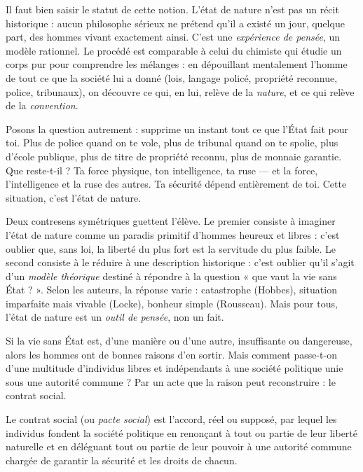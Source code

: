 \documentclass[11pt]{article}
\newcommand{\cle}[1]{{\popxbold\color{popdark}#1}}
\newcounter{popsec}
\newcounter{popsub}
\newcommand{\courssub}[1]{%
  \stepcounter{popsub}%
  \par\vspace{9pt}\noindent{\popxbold\fontsize{11.5}{13}\selectfont\color{popink}{\color{poporange}\thepopsec.\thepopsub}\hspace{6pt}#1}\par\nopagebreak\vspace{4pt}
}
\begin{document}
Il faut bien saisir le statut de cette notion. L'état de nature n'est pas un récit historique : aucun philosophe sérieux ne prétend qu'il a existé un jour, quelque part, des hommes vivant exactement ainsi. C'est une \emph{expérience de pensée}, un modèle rationnel. Le procédé est comparable à celui du chimiste qui étudie un corps pur pour comprendre les mélanges : en dépouillant mentalement l'homme de tout ce que la société lui a donné (lois, langage policé, propriété reconnue, police, tribunaux), on découvre ce qui, en lui, relève de la \emph{nature}, et ce qui relève de la \emph{convention}.

Posons la question autrement : supprime un instant tout ce que l'État fait pour toi. Plus de police quand on te vole, plus de tribunal quand on te spolie, plus d'école publique, plus de titre de propriété reconnu, plus de monnaie garantie. Que reste-t-il ? Ta force physique, ton intelligence, ta ruse — et la force, l'intelligence et la ruse des autres. Ta sécurité dépend entièrement de toi. Cette situation, c'est l'état de nature.

\begin{attention}
Deux contresens symétriques guettent l'élève. Le premier consiste à imaginer l'état de nature comme un paradis primitif d'hommes heureux et libres : c'est oublier que, sans loi, la liberté du plus fort est la servitude du plus faible. Le second consiste à le réduire à une description historique : c'est oublier qu'il s'agit d'un \emph{modèle théorique} destiné à répondre à la question « que vaut la vie sans État ? ». Selon les auteurs, la réponse varie : catastrophe (Hobbes), situation imparfaite mais vivable (Locke), bonheur simple (Rousseau). Mais pour tous, l'état de nature est un \emph{outil de pensée}, non un fait.
\end{attention}

\courssub{Le contrat social : la sortie de l'état de nature}

Si la vie sans État est, d'une manière ou d'une autre, insuffisante ou dangereuse, alors les hommes ont de bonnes raisons d'en sortir. Mais comment passe-t-on d'une multitude d'individus libres et indépendants à une société politique unie sous une autorité commune ? Par un acte que la raison peut reconstruire : le \cle{contrat social}.

\begin{definition}
Le \cle{contrat social} (ou \emph{pacte social}) est l'accord, réel ou supposé, par lequel les individus fondent la société politique en renonçant à tout ou partie de leur liberté naturelle et en déléguant tout ou partie de leur pouvoir à une autorité commune chargée de garantir la sécurité et les droits de chacun.
\end{definition}
\end{document}
